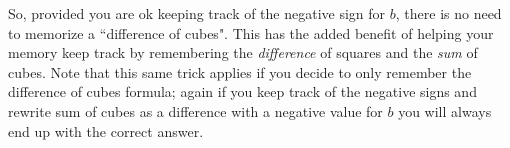 \documentclass{ximera}
\begin{document}
    So, provided you are ok keeping track of the negative sign for $b$, there is no need to memorize a ``difference of cubes". This has the added benefit of helping your memory keep track by remembering the \textit{difference} of squares and the \textit{sum} of cubes. Note that this same trick applies if you decide to only remember the difference of cubes formula; again if you keep track of the negative signs and rewrite sum of cubes as a difference with a negative value for $b$ you will always end up with the correct answer.
\end{document}
